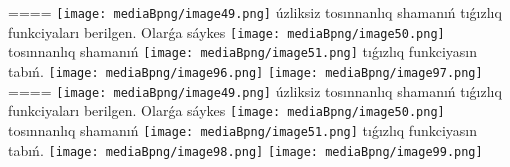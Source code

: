 ====
\texttt{[image: mediaBpng/image49.png]} úzliksiz tosınnanlıq shamanıń tıǵızlıq funkciyaları berilgen. Olarǵa sáykes \texttt{[image: mediaBpng/image50.png]} tosınnanlıq shamanıń \texttt{[image: mediaBpng/image51.png]} tıǵızlıq funkciyasın tabıń. \texttt{[image: mediaBpng/image96.png]} \texttt{[image: mediaBpng/image97.png]}
====
\texttt{[image: mediaBpng/image49.png]} úzliksiz tosınnanlıq shamanıń tıǵızlıq funkciyaları berilgen. Olarǵa sáykes \texttt{[image: mediaBpng/image50.png]} tosınnanlıq shamanıń \texttt{[image: mediaBpng/image51.png]} tıǵızlıq funkciyasın tabıń. \texttt{[image: mediaBpng/image98.png]} \texttt{[image: mediaBpng/image99.png]}